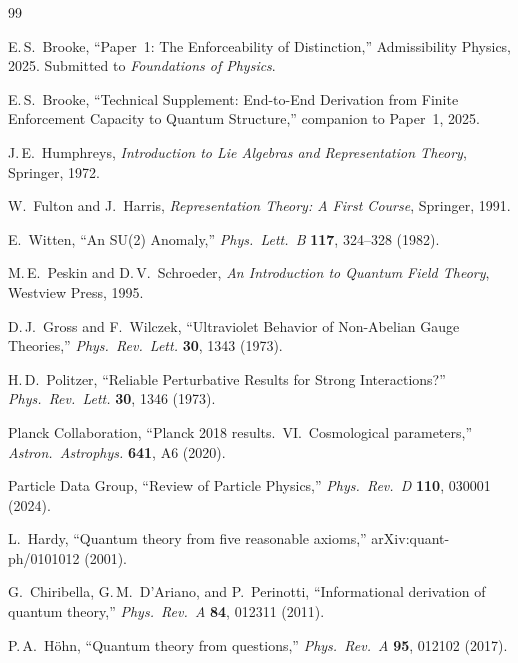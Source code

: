 \documentclass[11pt]{article}
\theoremstyle{definition}
\begin{document}

\begin{thebibliography}{99}

E.\,S.~Brooke, ``Paper~1: The Enforceability of Distinction,''
Admissibility Physics, 2025.
Submitted to \textit{Foundations of Physics}.

E.\,S.~Brooke, ``Technical Supplement: End-to-End Derivation from Finite
Enforcement Capacity to Quantum Structure,'' companion to Paper~1, 2025.

J.\,E.~Humphreys, \textit{Introduction to Lie Algebras and Representation
Theory}, Springer, 1972.

W.~Fulton and J.~Harris, \textit{Representation Theory: A First Course},
Springer, 1991.

E.~Witten, ``An SU(2) Anomaly,'' \textit{Phys.\ Lett.\ B} \textbf{117},
324--328 (1982).

M.\,E.~Peskin and D.\,V.~Schroeder, \textit{An Introduction to Quantum
Field Theory}, Westview Press, 1995.

D.\,J.~Gross and F.~Wilczek, ``Ultraviolet Behavior of Non-Abelian
Gauge Theories,'' \textit{Phys.\ Rev.\ Lett.} \textbf{30}, 1343 (1973).

H.\,D.~Politzer, ``Reliable Perturbative Results for Strong Interactions?''
\textit{Phys.\ Rev.\ Lett.} \textbf{30}, 1346 (1973).

Planck Collaboration, ``Planck 2018 results.\ VI.\ Cosmological
parameters,'' \textit{Astron.\ Astrophys.} \textbf{641}, A6 (2020).

Particle Data Group, ``Review of Particle Physics,''
\textit{Phys.\ Rev.\ D} \textbf{110}, 030001 (2024).

L.~Hardy, ``Quantum theory from five reasonable axioms,''
arXiv:quant-ph/0101012 (2001).

G.~Chiribella, G.\,M.~D'Ariano, and P.~Perinotti,
``Informational derivation of quantum theory,''
\textit{Phys.\ Rev.\ A} \textbf{84}, 012311 (2011).

P.\,A.~H\"ohn, ``Quantum theory from questions,''
\textit{Phys.\ Rev.\ A} \textbf{95}, 012102 (2017).


\end{thebibliography}
\end{document}
